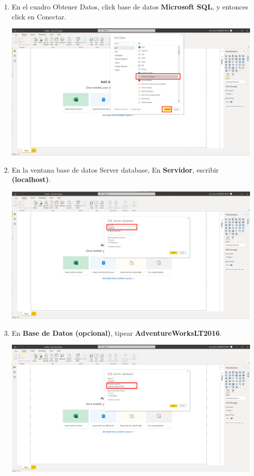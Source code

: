 \documentclass[12pt,letterpaper]{article}
\newcommand\tab[1][1cm]{\hspace*{#1}}
\begin{document}
\begin{enumerate}[\tab 1.]
\begin{center}
        \end{center}
        \item En el cuadro Obtener Datos, click base de datos \textbf{Microsoft SQL}, y entonces click en Conectar.
        \begin{center}
            \includegraphics[width=13cm]{./img/img6.png}
        \end{center}
        \item En la ventana base de datos Server database, En \textbf{Servidor}, escribir \textbf{(localhost)}.
        \begin{center}
            \includegraphics[width=13cm]{./img/img7.png}
        \end{center}
        \item En \textbf{Base de Datos (opcional)}, tipear \textbf{AdventureWorksLT2016}.
        \begin{center}
            \includegraphics[width=13cm]{./img/img8.png}

\end{center}
\end{enumerate}
\end{document}
